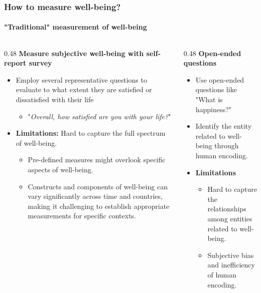 \documentclass[
	aspectratio=169, %
	t, %
	onlytextwidth, %
	10pt, %
]{beamer}
\begin{document}
\begin{frame}
	\frametitle{How to measure well-being?}
	\framesubtitle{"Traditional" measurement of well-being}
	
	\begin{columns}[T] %
		\begin{column}{0.48\linewidth} %
			\textbf{Measure subjective well-being with self-report survey}\\
			\begin{itemize}
			    \item Employ several representative questions to evaluate to what extent they are satisfied or dissatisfied with their life \citep{fordyce_review_1988}
                     \begin{itemize}
                         \item "\textit{Overall, how satisfied are you with your life?}"
                     \end{itemize}
                     \item \textbf{Limitations:} Hard to capture the full spectrum of well-being.
                     \begin{itemize}
                         \item Pre-defined measures might overlook specific aspects of well-being.
                         \item Constructs and components of well-being can vary significantly across time and countries, making it challenging to establish appropriate measurements for specific contexts.
                     \end{itemize}
			\end{itemize}
		\end{column}
            \pause
		\begin{column}{0.48\linewidth} %
			\textbf{Open-ended questions}\\
			\begin{itemize}
			    \item Use open-ended questions like "What is happiness?"
                    \item Identify the entity related to well-being through human encoding. 
                    \item \textbf{Limitations}
                    \begin{itemize}
                        \item Hard to capture the relationships among entities related to well-being.
                        \item Subjective bias and inefficiency of human encoding.
                    \end{itemize}
			\end{itemize}
		\end{column}
	\end{columns}
\end{frame}
\end{document}
